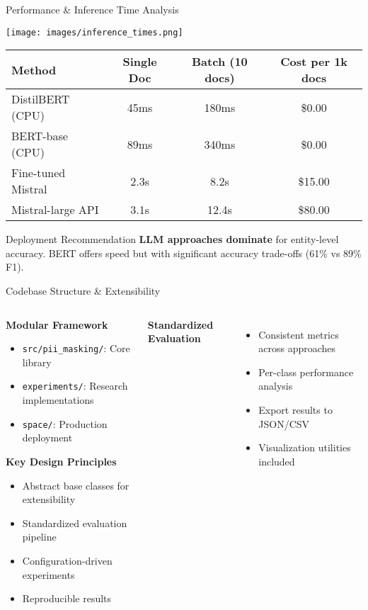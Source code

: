 \documentclass[aspectratio=169]{beamer}
\begin{document}
\begin{frame}{Performance \& Inference Time Analysis}
\begin{center}
\texttt{[image: images/inference\_times.png]}
\end{center}

\begin{table}[h]
\centering
\begin{tabular}{lccc}
\toprule
\textbf{Method} & \textbf{Single Doc} & \textbf{Batch (10 docs)} & \textbf{Cost per 1k docs} \\
\midrule
DistilBERT (CPU) & 45ms & 180ms & \$0.00 \\
BERT-base (CPU) & 89ms & 340ms & \$0.00 \\
Fine-tuned Mistral & 2.3s & 8.2s & \$15.00 \\
Mistral-large API & 3.1s & 12.4s & \$80.00 \\
\bottomrule
\end{tabular}
\end{table}

\begin{alertblock}{Deployment Recommendation}
\textbf{LLM approaches dominate} for entity-level accuracy. BERT offers speed but with significant accuracy trade-offs (61\% vs 89\% F1).
\end{alertblock}
\end{frame}

\begin{frame}{Codebase Structure \& Extensibility}
\begin{columns}
\begin{column}{0.5\textwidth}
\textbf{Modular Framework}
\begin{itemize}
\item \texttt{src/pii\_masking/}: Core library
\item \texttt{experiments/}: Research implementations  
\item \texttt{space/}: Production deployment
\end{itemize}

\vspace{0.3cm}
\textbf{Key Design Principles}
\begin{itemize}
\item Abstract base classes for extensibility
\item Standardized evaluation pipeline
\item Configuration-driven experiments
\item Reproducible results
\end{itemize}
\end{column}

\vspace{0.2cm}
\textbf{Standardized Evaluation}
\begin{itemize}
\item Consistent metrics across approaches
\item Per-class performance analysis
\item Export results to JSON/CSV
\item Visualization utilities included
\end{itemize}
\end{columns}
\end{frame}
\end{document}

